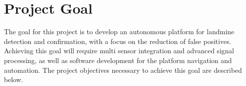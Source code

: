 \documentclass[main.tex]{subfiles}
\begin{document}
% 
% 
%

\section{Project Goal}

The goal for this project is to develop an autonomous platform for landmine detection and confirmation, with a focus on the reduction of false positives. Achieving this goal will require multi sensor integration and advanced signal processing, as well as software development for the platform navigation and automation. The project objectives necessary to achieve this goal are described below.
 
\end{document}
